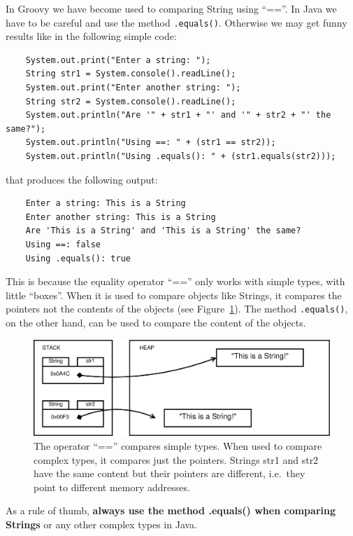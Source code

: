 In Groovy we have become used to comparing String using ``==''. In
Java we have to be careful and use the method
\verb+.equals()+. Otherwise we may get funny results like in the
following simple code: 

\begin{verbatim}
    System.out.print("Enter a string: ");
    String str1 = System.console().readLine();
    System.out.print("Enter another string: ");
    String str2 = System.console().readLine();
    System.out.println("Are '" + str1 + "' and '" + str2 + "' the same?");
    System.out.println("Using ==: " + (str1 == str2));
    System.out.println("Using .equals(): " + (str1.equals(str2)));
\end{verbatim}

that produces the following output: 

\begin{verbatim}
    Enter a string: This is a String
    Enter another string: This is a String
    Are 'This is a String' and 'This is a String' the same?
    Using ==: false
    Using .equals(): true
\end{verbatim}

This is because the equality operator ``=='' only works with simple
types, with little ``boxes''. When it is used to compare objects like
Strings, it compares the pointers not the contents of the objects (see
Figure~\ref{fig:equals}). The
method \verb+.equals()+, on the other hand, can be used to compare the
content of the objects. 

\begin{figure}[bthp]
  \centering
  \includegraphics[width=\textwidth]{gfx/variables-string-equals}
  \caption{The operator ``=='' compares simple types. When used to
    compare complex types, it compares just the pointers. Strings str1
  and str2 have the same content but their pointers are different,
  i.e.~they point to different memory addresses.} 
  \label{fig:equals}
\end{figure}

As a rule of thumb, \textbf{always use the method .equals()
  when comparing Strings} or any other complex types in Java.

